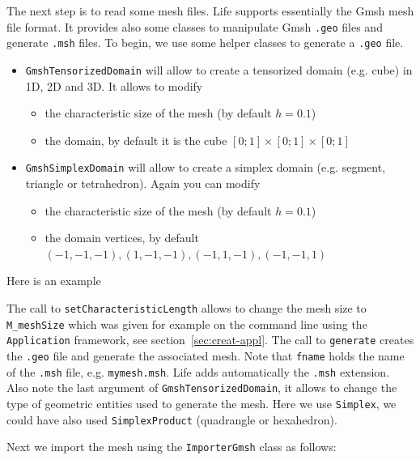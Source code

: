 \documentclass[a4paper]{book}
\begin{document}


The next step is to read some mesh files. Life supports essentially
the Gmsh mesh file format. It provides also some classes to manipulate
Gmsh \lstinline!.geo! files and generate \lstinline!.msh! files. To
begin, we use some helper classes to generate a \lstinline!.geo! file.

\begin{itemize}
\item \lstinline!GmshTensorizedDomain! will allow to create a
  tensorized domain (e.g. cube) in 1D, 2D and 3D. It allows to modify
  \begin{itemize}
  \item the characteristic size of the mesh (by default $h=0.1$)
  \item the domain, by default it is the cube $[0;1]\times[0;1]\times[0;1]$
  \end{itemize}
\item \lstinline!GmshSimplexDomain! will allow to create a simplex
  domain (e.g. segment, triangle or tetrahedron). Again you can modify
  \begin{itemize}
  \item the characteristic size of the mesh (by default $h=0.1$)
  \item the domain vertices, by default $(-1,-1,-1), (1,-1,-1), (-1,1,-1), (-1,-1,1)$
  \end{itemize}
\end{itemize}

Here is an example



The call to \lstinline!setCharacteristicLength! allows to change the
mesh size to \lstinline!M_meshSize! which was given for example on the
command line using the \lstinline!Application! framework, see
section~\ref{sec:creat-appl}. The call to \lstinline!generate! creates
the \lstinline!.geo! file and generate the associated mesh. Note that
\lstinline!fname! holds the name of the \lstinline!.msh! file,
e.g. \lstinline!mymesh.msh!. Life adds automatically the
\lstinline!.msh!  extension. Also note the last argument of
\lstinline!GmshTensorizedDomain!, it allows to change the type of
geometric entities used to generate the mesh. Here we use
\lstinline!Simplex!, we could have also used
\lstinline!SimplexProduct! (quadrangle or hexahedron).


Next we import the mesh using the
\lstinline!ImporterGmsh! class as follows:
\end{document}
